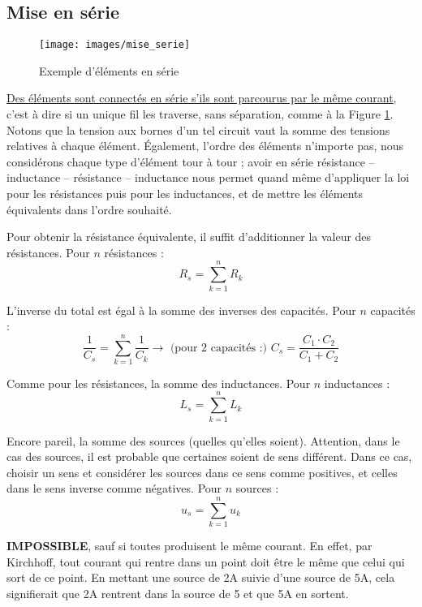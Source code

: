 \documentclass[12pt,a4paper]{article}
\begin{document}
\subsection{Mise en série}
\label{subsection: mise en serie}
\begin{figure}
	\centering
	\texttt{[image: images/mise\_serie]}
	\caption{Exemple d'éléments en série}
	\label{fig: mise en serie}
\end{figure}
\uline{Des éléments sont connectés en série s'ils sont parcourus par le même courant}, c'est à dire si un unique fil les traverse, sans séparation, comme à la Figure \ref{fig: mise en serie}. Notons que la tension aux bornes d'un tel circuit vaut la somme des tensions relatives à chaque élément. Également, l'ordre des éléments n'importe pas, nous considérons chaque type d'élément tour à tour ; avoir en série résistance -- inductance -- résistance -- inductance nous permet quand même d'appliquer la loi pour les résistances puis pour les inductances, et de mettre les éléments équivalents dans l'ordre souhaité.
\begin{boite}
	 Pour obtenir la résistance équivalente, il suffit d'additionner la valeur des résistances. Pour $n$ résistances :
	\begin{equation}	
		R_{s} = \sum_{k=1}^n R_k
	\end{equation}
\end{boite}
\begin{boite}
	 L'inverse du total est égal à la somme des inverses des capacités. Pour $n$ capacités :
	\begin{equation}
		\frac{1}{C_{s}} = \sum_{k=1}^n \frac{1}{C_k} \to \text{ (pour 2 capacités :) } C_{s} = \frac{C_1 \cdot C_2}{C_1 + C_2}
	\end{equation}		
\end{boite}
\begin{boite}
	 Comme pour les résistances, la somme des inductances. Pour $n$ inductances :
	\begin{equation}
		L_{s} = \sum_{k=1}^n L_k	
	\end{equation}		
\end{boite}
\begin{boite}
	 Encore pareil, la somme des sources (quelles qu'elles soient). Attention, dans le cas des sources, il est probable que certaines soient de sens différent. Dans ce cas, choisir un sens et considérer les sources dans ce sens comme positives, et celles dans le sens inverse comme négatives. Pour $n$ sources :
	\begin{equation}
		u_{s} = \sum_{k=1}^n u_k
	\end{equation}		
\end{boite}
\begin{boite}
	 \textbf{IMPOSSIBLE}, sauf si toutes produisent le même courant. En effet, par Kirchhoff, tout courant qui rentre dans un point doit être le même que celui qui sort de ce point. En mettant une source de 2A suivie d'une source de 5A, cela signifierait que 2A rentrent dans la source de 5 et que 5A en sortent. 
\end{boite}
\end{document}
